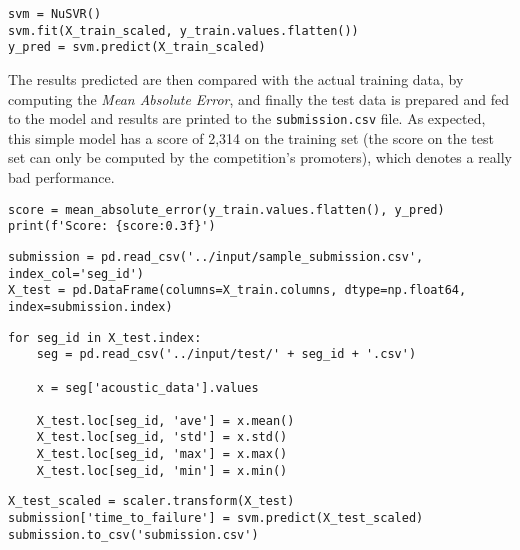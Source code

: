 \begin{lstlisting}[firstnumber=45]
svm = NuSVR()
svm.fit(X_train_scaled, y_train.values.flatten())
y_pred = svm.predict(X_train_scaled)
\end{lstlisting}

The results predicted are then compared with the actual training data, by computing the \textit{Mean Absolute Error}, and finally the test data is prepared and fed to the model and results are printed to the \texttt{submission.csv} file. As expected, this simple model has a score of 2,314 on the training set (the score on the test set can only be computed by the competition's promoters), which denotes a really bad performance.

\begin{lstlisting}[firstnumber=48]
score = mean_absolute_error(y_train.values.flatten(), y_pred)
print(f'Score: {score:0.3f}')
\end{lstlisting}

\begin{lstlisting}[firstnumber=50]
submission = pd.read_csv('../input/sample_submission.csv', index_col='seg_id')
X_test = pd.DataFrame(columns=X_train.columns, dtype=np.float64, index=submission.index)
\end{lstlisting}

\begin{lstlisting}[firstnumber=52]
for seg_id in X_test.index:
    seg = pd.read_csv('../input/test/' + seg_id + '.csv')
    
    x = seg['acoustic_data'].values
    
    X_test.loc[seg_id, 'ave'] = x.mean()
    X_test.loc[seg_id, 'std'] = x.std()
    X_test.loc[seg_id, 'max'] = x.max()
    X_test.loc[seg_id, 'min'] = x.min()
\end{lstlisting}

\begin{lstlisting}[firstnumber=61]
X_test_scaled = scaler.transform(X_test)
submission['time_to_failure'] = svm.predict(X_test_scaled)
submission.to_csv('submission.csv')
\end{lstlisting}